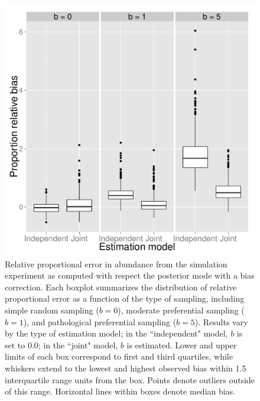 \documentclass[times,mee,doublespace,]{besauth2}
\begin{document}
\begin{figure} %
\begin{center}
\includegraphics[width=170mm]{bias.pdf}
\caption{Relative proportional error in abundance from the simulation experiment as computed with respect the posterior mode with a bias correction. Each boxplot summarizes the distribution of relative proportional error as a function of the type of sampling, including simple random sampling ($b=0$), moderate preferential sampling ($b=1$), and pathological preferential sampling ($b=5$). Results vary by the type of estimation model; in the ``independent" model, $b$ is set to 0.0; in the ``joint" model, $b$ is estimated.  Lower and upper limits of each box correspond to first and third quartiles, while whiskers extend to the lowest and highest observed bias within 1.5 interquartile range units from the box.  Points denote outliers outside of this range.  Horizontal lines within boxes denote median bias.  }
\label{fig:sim_bias}
\end{center}
\end{figure}
\end{document}
